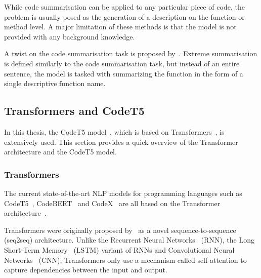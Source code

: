While code summarisation can be applied to any particular piece of code, the problem is usually posed as the generation of a description on the function or method level. A major limitation of these methods is that the model is not provided with any background knowledge. 

A twist on the code summarisation task is proposed by~\citeauthor{ExtremeSummarization}. Extreme summarisation is defined similarly to the code summarisation task, but instead of an entire sentence, the model is tasked with summarizing the function in the form of a single descriptive function name.

\subsection{Transformers and CodeT5}
In this thesis, the CodeT5 model~\cite{CodeT5}, which is based on Transformers~\cite{Transformers}, is extensively used. This section provides a quick overview of the Transformer architecture and the CodeT5 model.

\subsubsection{Transformers}
The current state-of-the-art NLP models for programming languages such as CodeT5~\cite{CodeT5}, CodeBERT~\cite{CodeBERT} and CodeX~\cite{CodeX} are all based on the Transformer architecture~\cite{Transformers}.

Transformers were originally proposed by~\citeauthor{Transformers} as a novel sequence-to-sequence~\cite{seq2seq} (seq2seq) architecture. Unlike the Recurrent Neural Networks~\cite{RNN} (RNN), the Long Short-Term Memory~\cite{LSTM} (LSTM) variant of RNNs and Convolutional Neural Networks~\cite{CNN} (CNN), Transformers only use a mechanism called self-attention to capture dependencies between the input and output. 

